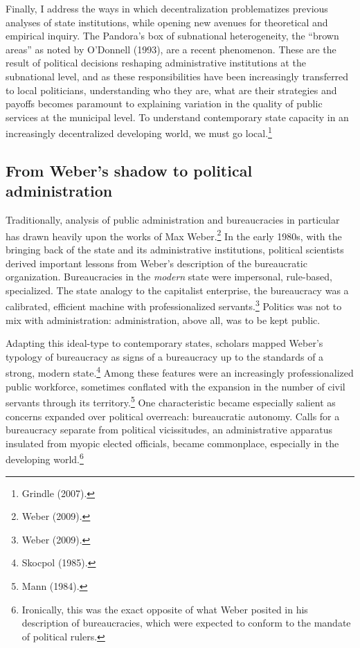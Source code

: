 \documentclass[12pt,]{article}
\let\rmarkdownfootnote\footnote%
\def\footnote{\protect\rmarkdownfootnote}
\begin{document}
Finally, I address the ways in which decentralization problematizes
previous analyses of state institutions, while opening new avenues for
theoretical and empirical inquiry. The Pandora's box of subnational
heterogeneity, the ``brown areas'' as noted by O'Donnell (1993), are a
recent phenomenon. These are the result of political decisions reshaping
administrative institutions at the subnational level, and as these
responsibilities have been increasingly transferred to local
politicians, understanding who they are, what are their strategies and
payoffs becomes paramount to explaining variation in the quality of
public services at the municipal level. To understand contemporary state
capacity in an increasingly decentralized developing world, we must go
local.\footnote{Grindle (2007).}

\hypertarget{from-webers-shadow-to-political-administration}{%
\subsection{From Weber's shadow to political
administration}\label{from-webers-shadow-to-political-administration}}

Traditionally, analysis of public administration and bureaucracies in
particular has drawn heavily upon the works of Max Weber.\footnote{Weber
  (2009).} In the early 1980s, with the bringing back of the state and
its administrative institutions, political scientists derived important
lessons from Weber's description of the bureaucratic organization.
Bureaucracies in the \emph{modern} state were impersonal, rule-based,
specialized. The state analogy to the capitalist enterprise, the
bureaucracy was a calibrated, efficient machine with professionalized
servants.\footnote{Weber (2009).} Politics was not to mix with
administration: administration, above all, was to be kept public.

Adapting this ideal-type to contemporary states, scholars mapped Weber's
typology of bureaucracy as signs of a bureaucracy up to the standards of
a strong, modern state.\footnote{Skocpol (1985).} Among these features
were an increasingly professionalized public workforce, sometimes
conflated with the expansion in the number of civil servants through its
territory.\footnote{Mann (1984).} One characteristic became especially
salient as concerns expanded over political overreach: bureaucratic
autonomy. Calls for a bureaucracy separate from political vicissitudes,
an administrative apparatus insulated from myopic elected officials,
became commonplace, especially in the developing world.\footnote{Ironically,
  this was the exact opposite of what Weber posited in his description
  of bureaucracies, which were expected to conform to the mandate of
  political rulers.}
\end{document}
